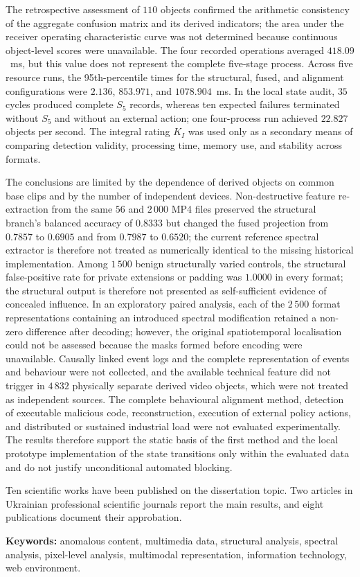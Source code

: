 The retrospective assessment of $110$ objects confirmed the arithmetic consistency of the aggregate confusion matrix and its derived indicators; the area under the receiver operating characteristic curve was not determined because continuous object-level scores were unavailable. The four recorded operations averaged $418.09$~ms, but this value does not represent the complete five-stage process. Across five resource runs, the 95th-percentile times for the structural, fused, and alignment configurations were $2.136$, $853.971$, and $1078.904$~ms. In the local state audit, $35$ cycles produced complete $S_5$ records, whereas ten expected failures terminated without $S_5$ and without an external action; one four-process run achieved $22.827$ objects per second. The integral rating $K_I$ was used only as a secondary means of comparing detection validity, processing time, memory use, and stability across formats.

The conclusions are limited by the dependence of derived objects on common base clips and by the number of independent devices. Non-destructive feature re-extraction from the same $56$ and $2\,000$ MP4 files preserved the structural branch's balanced accuracy of $0.8333$ but changed the fused projection from $0.7857$ to $0.6905$ and from $0.7987$ to $0.6520$; the current reference spectral extractor is therefore not treated as numerically identical to the missing historical implementation. Among $1\,500$ benign structurally varied controls, the structural false-positive rate for private extensions or padding was $1.0000$ in every format; the structural output is therefore not presented as self-sufficient evidence of concealed influence. In an exploratory paired analysis, each of the $2\,500$ format representations containing an introduced spectral modification retained a non-zero difference after decoding; however, the original spatiotemporal localisation could not be assessed because the masks formed before encoding were unavailable. Causally linked event logs and the complete representation of events and behaviour were not collected, and the available technical feature did not trigger in $4\,832$ physically separate derived video objects, which were not treated as independent sources. The complete behavioural alignment method, detection of executable malicious code, reconstruction, execution of external policy actions, and distributed or sustained industrial load were not evaluated experimentally. The results therefore support the static basis of the first method and the local prototype implementation of the state transitions only within the evaluated data and do not justify unconditional automated blocking.

Ten scientific works have been published on the dissertation topic. Two articles in Ukrainian professional scientific journals report the main results, and eight publications document their approbation.

\textbf{Keywords:} anomalous content, multimedia data, structural analysis, spectral analysis, pixel-level analysis, multimodal representation, information technology, web environment.

\clearpage
